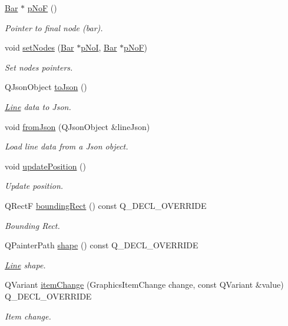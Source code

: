 \begin{DoxyCompactItemize}
\hyperlink{class_bar}{Bar} $\ast$ \hyperlink{group___models_gabbc73ddedd3075c33ae5331bd7c9829f}{p\+No\+F} ()
\begin{DoxyCompactList}\small\item\em Pointer to final node (bar). \end{DoxyCompactList}\item 
void \hyperlink{group___models_gaeeab146e6c1d7d1a688a2764a9c9a170}{set\+Nodes} (\hyperlink{class_bar}{Bar} $\ast$\hyperlink{group___models_gaeafd90e84ac2f8de2a879abe9e53eef3}{p\+No\+I}, \hyperlink{class_bar}{Bar} $\ast$\hyperlink{group___models_gabbc73ddedd3075c33ae5331bd7c9829f}{p\+No\+F})
\begin{DoxyCompactList}\small\item\em Set nodes pointers. \end{DoxyCompactList}\item 
Q\+Json\+Object \hyperlink{group___models_ga4effa7a96db465ea6e01135d5a010739}{to\+Json} ()
\begin{DoxyCompactList}\small\item\em \hyperlink{class_line}{Line} data to Json. \end{DoxyCompactList}\item 
void \hyperlink{group___models_ga62623ad71df5279377cc69da90decc75}{from\+Json} (Q\+Json\+Object \&line\+Json)
\begin{DoxyCompactList}\small\item\em Load line data from a Json object. \end{DoxyCompactList}\item 
void \hyperlink{group___models_ga8fdb12651d4bc592616d241386b066b3}{update\+Position} ()
\begin{DoxyCompactList}\small\item\em Update position. \end{DoxyCompactList}\item 
Q\+Rect\+F \hyperlink{group___models_gad15c3af158d3b966c04be7e18cee5aea}{bounding\+Rect} () const Q\+\_\+\+D\+E\+C\+L\+\_\+\+O\+V\+E\+R\+R\+I\+D\+E
\begin{DoxyCompactList}\small\item\em Bounding Rect. \end{DoxyCompactList}\item 
Q\+Painter\+Path \hyperlink{group___models_gaf1736b829a643d99052ef6428ddd5b16}{shape} () const Q\+\_\+\+D\+E\+C\+L\+\_\+\+O\+V\+E\+R\+R\+I\+D\+E
\begin{DoxyCompactList}\small\item\em \hyperlink{class_line}{Line} shape. \end{DoxyCompactList}\item 
Q\+Variant \hyperlink{group___models_ga5fcee3f23eb50e34f730d602a3802b93}{item\+Change} (Graphics\+Item\+Change change, const Q\+Variant \&value) Q\+\_\+\+D\+E\+C\+L\+\_\+\+O\+V\+E\+R\+R\+I\+D\+E
\begin{DoxyCompactList}\small\item\em Item change. \end{DoxyCompactList}\end{DoxyCompactItemize}
